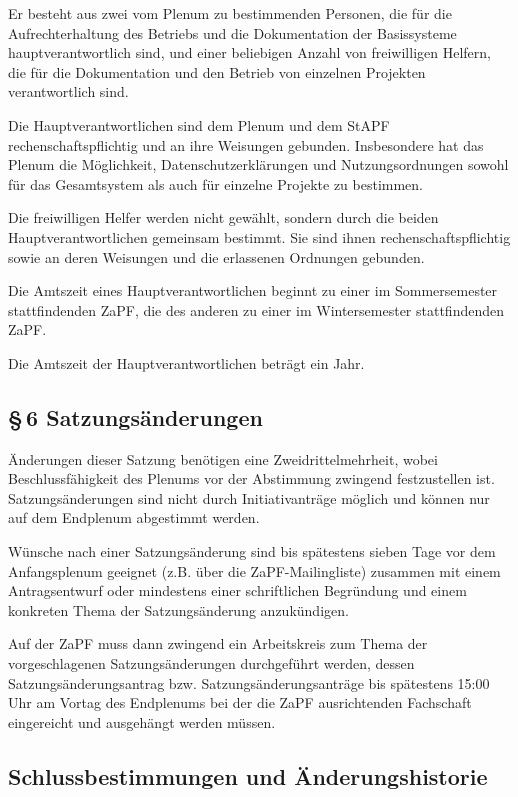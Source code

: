 Er besteht aus zwei vom Plenum zu bestimmenden Personen, die für die
Aufrechterhaltung des Betriebs und die Dokumentation der Basissysteme
hauptverantwortlich sind, und einer beliebigen Anzahl von freiwilligen Helfern,
die für die Dokumentation und den Betrieb von einzelnen Projekten verantwortlich
sind.

Die Hauptverantwortlichen sind dem Plenum und dem StAPF rechenschaftspflichtig
und an ihre Weisungen gebunden. Insbesondere hat das Plenum die Möglichkeit,
Datenschutzerklärungen und Nutzungsordnungen sowohl für das Gesamtsystem als
auch für einzelne Projekte zu bestimmen.

Die freiwilligen Helfer werden nicht gewählt, sondern durch die beiden
Hauptverantwortlichen gemeinsam bestimmt. Sie sind ihnen rechenschaftspflichtig
sowie an deren Weisungen und die erlassenen Ordnungen gebunden.

Die Amtszeit eines Hauptverantwortlichen beginnt zu einer im Sommersemester
stattfindenden ZaPF, die des anderen zu einer im Wintersemester stattfindenden
ZaPF.

Die Amtszeit der Hauptverantwortlichen beträgt ein Jahr.


\subsection*{§\,6 Satzungsänderungen%
  \label{satzungsanderungen}%
}

Änderungen dieser Satzung benötigen eine Zweidrittelmehrheit, wobei Beschlussfähigkeit
des Plenums vor der Abstimmung zwingend festzustellen ist. Satzungsänderungen
sind nicht durch Initiativanträge möglich und können nur auf dem Endplenum
abgestimmt werden.

Wünsche nach einer Satzungsänderung sind bis spätestens sieben Tage vor dem
Anfangsplenum geeignet (z.B. über die ZaPF-Mailingliste)
zusammen mit einem Antragsentwurf oder mindestens einer schriftlichen
Begründung und einem konkreten Thema der Satzungsänderung anzukündigen.

Auf der ZaPF muss dann zwingend ein Arbeitskreis zum Thema der vorgeschlagenen
Satzungsänderungen durchgeführt werden, dessen Satzungsänderungsantrag bzw.
Satzungsänderungsanträge bis spätestens 15:00 Uhr am Vortag des Endplenums bei
der die ZaPF ausrichtenden Fachschaft eingereicht und ausgehängt werden müssen.


\subsection*{Schlussbestimmungen und Änderungshistorie%
  \label{schlussbestimmungen-und-anderungshistorie}%
}


